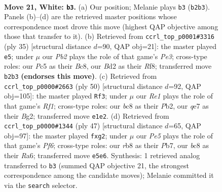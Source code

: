 \documentclass[11pt]{article}
\begin{document}
\clearpage

\begin{figure}[p]\centering
\begin{subfigure}{0.46\textwidth}\centering
\resizebox{\linewidth}{!}{%
\newchessgame
\chessboard[
  setfen={1rbrn1k1/p1p1qp2/6p1/Q1PpP2p/3N4/4P1P1/pP1B1P1P/2K1RBR1 w - - 0 21},
  showmover=false,
  pgfstyle=straightmove, color=movearrow, markmove={b2-b3}
]}
\caption{}
\end{subfigure}\hfill
\begin{subfigure}{0.46\textwidth}\centering
\resizebox{\linewidth}{!}{%
\newchessgame
\chessboard[
  setfen={r1bq1rk1/pp2bp2/4p1p1/7p/3P1BnP/P1NQ1P2/1PB3P1/4RRK1 b - - 0 18},
  showmover=false,
  pgfstyle=straightmove, color=movearrow, markmove={e6-e5}
]}
\caption{}
\end{subfigure}
\\[4pt]
\begin{subfigure}{0.46\textwidth}\centering
\resizebox{\linewidth}{!}{%
\newchessgame
\chessboard[
  setfen={4r1k1/3q1p2/pr3bpp/3p4/1npP1PP1/2N1P2Q/1P4BP/3R1R1K w - - 2 26},
  showmover=false,
  pgfstyle=straightmove, color=movearrow, markmove={f1-f3}
]}
\caption{}
\end{subfigure}\hfill
\begin{subfigure}{0.46\textwidth}\centering
\resizebox{\linewidth}{!}{%
\newchessgame
\chessboard[
  setfen={2b2r1k/1p4b1/r1p4p/4q1p1/p3P3/P4p2/BPQR1PPP/2N1R1K1 b - - 1 24},
  showmover=false,
  pgfstyle=straightmove, color=movearrow, markmove={f3-g2}
]}
\caption{}
\end{subfigure}
\caption{\textbf{Move 21, White: \texttt{b3}.} (a) Our position; Melanie plays \texttt{b3} (\texttt{b2b3}). Panels (b)--(d) are the retrieved master positions whose correspondence most drove this move (highest QAP objective among those that transfer to it). (b) Retrieved from \texttt{ccrl\_top\_p0001\#3316} (ply 35) [structural distance $d$=90, QAP obj=21]: the master played \texttt{e5}; under $\mu$ our \emph{Pb2} plays the role of that game's \emph{Pe3}; cross-type roles: our \emph{P}c5 as their \emph{B}c8, our \emph{B}d2 as their \emph{R}f8; transferred move \texttt{b2b3} \textbf{(endorses this move)}. (c) Retrieved from \texttt{ccrl\_top\_p0000\#2663} (ply 50) [structural distance $d$=92, QAP obj=105]: the master played \texttt{Rf3}; under $\mu$ our \emph{Re1} plays the role of that game's \emph{Rf1}; cross-type roles: our \emph{b}c8 as their \emph{P}b2, our \emph{q}e7 as their \emph{B}g2; transferred move \texttt{e1e2}. (d) Retrieved from \texttt{ccrl\_top\_p0000\#1344} (ply 47) [structural distance $d$=65, QAP obj=97]: the master played \texttt{fxg2}; under $\mu$ our \emph{Pe5} plays the role of that game's \emph{Pf6}; cross-type roles: our \emph{r}b8 as their \emph{P}b7, our \emph{b}c8 as their \emph{R}a6; transferred move \texttt{e5e6}. Synthesis: 1 retrieved analog transferred to \texttt{b3} (summed QAP objective 21, the strongest correspondence among the candidate moves); Melanie committed it via the \texttt{search} selector.}
\label{fig:thought-m40}
\end{figure}
\end{document}
